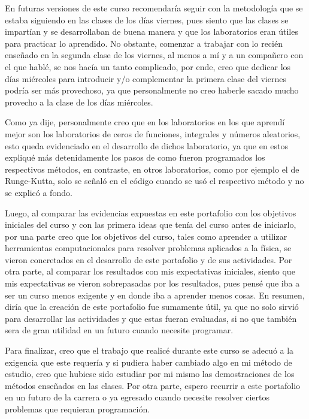 \documentclass[../portafolio.tex]{subfiles}
\begin{document}
\vspace{2mm}
En futuras versiones de este curso recomendaría seguir con la metodología que se estaba siguiendo en las clases de los días viernes, pues siento que las clases se impartían y se desarrollaban de buena manera y que los laboratorios eran útiles para practicar lo aprendido. No obstante, comenzar a trabajar con lo recién enseñado en la segunda clase de los viernes, al menos a mí y a un compañero con el que hablé, se nos hacía un tanto complicado, por ende, creo que dedicar los días miércoles para introducir y/o complementar la primera clase del viernes podría ser más provechoso, ya que personalmente no creo haberle sacado mucho provecho a la clase de los días miércoles. 

\vspace{2mm}
Como ya dije, personalmente creo que en los laboratorios en los que aprendí mejor son los laboratorios de ceros de funciones, integrales y números aleatorios, esto queda evidenciado en el desarrollo de dichos laboratorio, ya que en estos expliqué más detenidamente los pasos de como fueron programados los respectivos métodos, en contraste, en otros laboratorios, como por ejemplo el de Runge-Kutta, solo se señaló en el código cuando se usó el respectivo método y no se explicó a fondo.

\vspace{2mm}
Luego, al comparar las evidencias expuestas en este portafolio con los objetivos iniciales del curso y con las primera ideas que tenía del curso antes de iniciarlo, por una parte creo que los objetivos del curso, tales como aprender a utilizar herramientas computacionales para resolver problemas aplicados a la física, se vieron concretados en el desarrollo de este portafolio y de sus actividades. Por otra parte, al comparar los resultados con mis expectativas iniciales, siento que mis expectativas se vieron sobrepasadas por los resultados, pues pensé que iba a ser un curso menos exigente y en donde iba a aprender menos cosas. En resumen, diría que la creación de este portafolio fue sumamente útil, ya que no solo sirvió para desarrollar las actividades y que estas fueran evaluadas, si no que también sera de gran utilidad en un futuro cuando necesite programar.








\vspace{2mm}
Para finalizar, creo que el trabajo que realicé durante este curso se adecuó a la exigencia que este requería y si pudiera haber cambiado algo en mi método de estudio, creo que hubiese sido estudiar por mi mismo las demostraciones de los métodos enseñados en las clases. Por otra parte, espero recurrir a este portafolio en un futuro de la carrera o ya egresado cuando necesite resolver ciertos problemas que requieran programación.
\end{document}
